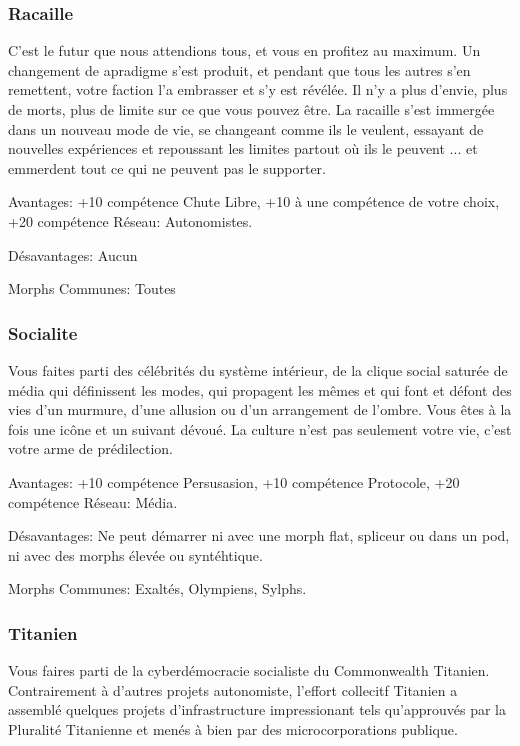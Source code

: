 \subsubsection{Racaille} \label{sec:background-scum} 

C'est le futur que nous attendions tous, et vous en profitez au maximum. Un changement de apradigme s'est produit, et pendant que tous les autres s'en remettent, votre faction l'a embrasser et s'y est révélée. Il n'y a plus d'envie, plus de morts, plus de limite sur ce que vous pouvez être. La racaille s'est immergée dans un nouveau mode de vie, se changeant comme ils le veulent, essayant de nouvelles expériences et repoussant les limites partout où ils le peuvent ... et emmerdent tout ce qui ne peuvent pas le supporter. 

Avantages: +10 compétence Chute Libre, +10 à une compétence de votre choix, +20 compétence Réseau: Autonomistes. 

Désavantages: Aucun 

Morphs Communes: Toutes 

\subsubsection{Socialite} \label{sec:socialite} Vous faites parti des célébrités du système intérieur, de la clique social saturée de média qui définissent les modes, qui propagent les mêmes et qui font et défont des vies d'un murmure, d'une allusion ou d'un arrangement de l'ombre. Vous êtes à la fois une icône et un suivant dévoué. La culture n'est pas seulement votre vie, c'est votre arme de prédilection. 

Avantages: +10 compétence Persusasion, +10 compétence Protocole, +20 compétence Réseau: Média. 

Désavantages: Ne peut démarrer ni avec une morph flat, spliceur ou dans un pod, ni avec des morphs élevée ou syntéhtique. 

Morphs Communes: Exaltés, Olympiens, Sylphs. 

\subsubsection{Titanien} \label{sec:titanian} 

Vous faires parti de la cyberdémocracie socialiste du Commonwealth Titanien. Contrairement à d'autres projets autonomiste, l'effort collecitf Titanien a assemblé quelques projets d'infrastructure impressionant tels qu'approuvés par la Pluralité Titanienne et menés à bien par des microcorporations publique. 

